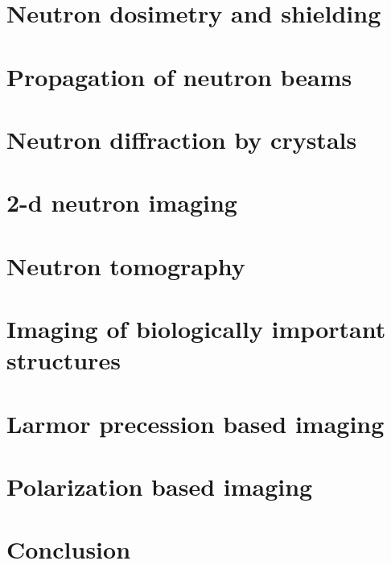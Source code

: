 \documentclass{article}
\numberwithin{equation}{section}
\begin{document}
\section{Neutron dosimetry and shielding}\label{s6}
\section{Propagation of neutron beams}\label{s7}
\section{Neutron diffraction by crystals}\label{s8}
\section{2-d neutron imaging}\label{s9}
\section{Neutron tomography}\label{s10}
\section{Imaging of biologically important structures}\label{s11}
\section{Larmor precession based imaging}\label{s12}
\section{Polarization based imaging}\label{s13}
\section{Conclusion}\label{s14}


\end{document}
